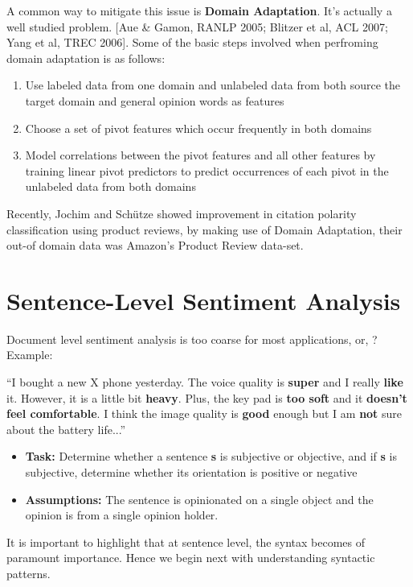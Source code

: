 A common way to mitigate this issue is \textbf{Domain Adaptation}. It's actually a well studied problem. [Aue \& Gamon, RANLP 2005; Blitzer et al, ACL 2007; Yang et al, TREC 2006]. Some of the basic steps involved when perfroming domain adaptation is as follows:
\begin{enumerate}
\item Use labeled data from one domain and unlabeled data from both source the target domain and general opinion words as features
\item Choose a set of pivot features which occur frequently in both domains
\item Model correlations between the pivot features and all other features by training linear pivot predictors to predict occurrences of each pivot in the unlabeled data from both domains
\end{enumerate}
Recently, Jochim and Sch{\"u}tze  showed improvement in citation polarity classification using product reviews, by making use of Domain Adaptation, their out-of domain data was Amazon's Product Review data-set.

\section{Sentence-Level Sentiment Analysis}
Document level sentiment analysis is too coarse for most applications,\Smiley{} or, \Frowny{}? Example:
\newline

“I bought a new X phone yesterday. The voice quality is \textbf{super} and I really \textbf{like} it. However, it is a little bit \textbf{heavy}. Plus, the key pad is \textbf{too soft} and it \textbf{doesn’t feel comfortable}. I think the image quality is \textbf{good} enough but I am \textbf{not} sure about the battery life...”
\begin{itemize}
\item \textbf{Task:} Determine whether a sentence \textbf{s} is subjective or objective, and if \textbf{s} is subjective, determine whether its orientation is positive or negative
\item \textbf{Assumptions:} The sentence is opinionated on a single object and the opinion is from a single opinion holder.
\end{itemize}

It is important to highlight that at sentence level, the syntax becomes of paramount importance. Hence we begin next with understanding syntactic patterns.

